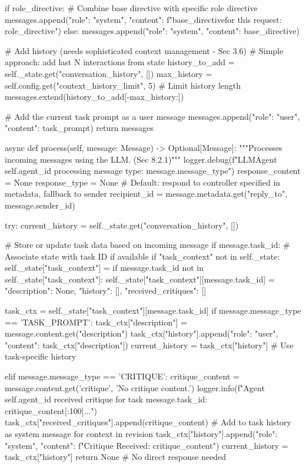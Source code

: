 \documentclass{amsbook}
\theoremstyle{definition}
\theoremstyle{remark}
\numberwithin{equation}{chapter} %
\begin{document}
\begin{python}
        if role_directive:
            # Combine base directive with specific role directive
             messages.append({"role": "system", "content": f"{base_directive}\nSpecifically for this request: {role_directive}"})
        else:
             messages.append({"role": "system", "content": base_directive})

        # Add history (needs sophisticated context management - Sec 3.6)
        # Simple approach: add last N interactions from state
        history_to_add = self._state.get("conversation_history", [])
        max_history = self.config.get("context_history_limit", 5) # Limit history length
        messages.extend(history_to_add[-max_history:])

        # Add the current task prompt as a user message
        messages.append({"role": "user", "content": task_prompt})
        return messages

    async def process(self, message: Message) -> Optional[Message]:
        """Processes incoming messages using the LLM. (Sec 8.2.1)"""
        logger.debug(f"LLMAgent {self.agent_id} processing message type: {message.message_type}")
        response_content = None
        response_type = None
        # Default: respond to controller specified in metadata, fallback to sender
        recipient_id = message.metadata.get("reply_to", message.sender_id)

        try:
            current_history = self._state.get("conversation_history", [])

            # Store or update task data based on incoming message
            if message.task_id: # Associate state with task ID if available
                 if "task_context" not in self._state: self._state["task_context"] = {}
                 if message.task_id not in self._state["task_context"]:
                      self._state["task_context"][message.task_id] = {"description": None, "history": [], "received_critiques": []}

                 task_ctx = self._state["task_context"][message.task_id]
                 if message.message_type == 'TASK_PROMPT':
                      task_ctx["description"] = message.content.get("description")
                      task_ctx["history"].append({"role": "user", "content": task_ctx["description"]})
                      current_history = task_ctx["history"] # Use task-specific history

                 elif message.message_type == 'CRITIQUE':
                     critique_content = message.content.get('critique', 'No critique content.')
                     logger.info(f"Agent {self.agent_id} received critique for task {message.task_id}: {critique_content[:100]}...")
                     task_ctx["received_critiques"].append(critique_content)
                     # Add to task history as system message for context in revision
                     task_ctx["history"].append({"role": "system", "content": f"Critique Received: {critique_content}"})
                     current_history = task_ctx["history"]
                     return None # No direct response needed


\end{python}
\end{document}
